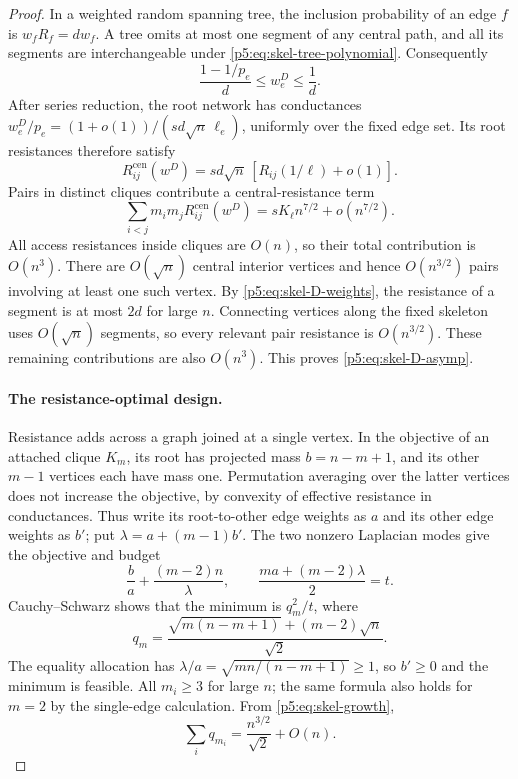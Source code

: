 \documentclass[11pt,a4paper]{article}
\theoremstyle{definition}
\theoremstyle{remark}
\numberwithin{equation}{section}
\begin{document}
\begin{proof}
In a weighted random spanning tree, the inclusion probability
of an edge $f$ is $w_fR_f=dw_f$.  A tree omits at most one
segment of any central path, and all its segments are
interchangeable under \eqref{p5:eq:skel-tree-polynomial}.  Consequently
\begin{equation}\label{p5:eq:skel-D-weights}
 \frac{1-1/p_e}{d}\leq w_e^D\leq\frac1d.
\end{equation}
After series reduction, the root network has conductances
$w_e^D/p_e=(1+o(1))/(s d\sqrt n\,\ell_e)$, uniformly over the
fixed edge set.  Its root resistances therefore satisfy
\[
 R_{ij}^{\mathrm{cen}}(w^D)
 =s d\sqrt n\,[R_{ij}(1/\ell)+o(1)].
\]
Pairs in distinct cliques contribute a central-resistance term
\[
 \sum_{i<j}m_im_jR_{ij}^{\mathrm{cen}}(w^D)
 =sK_\ell n^{7/2}+o(n^{7/2}).
\]
All access resistances inside cliques are $O(n)$, so their
total contribution is $O(n^3)$.  There are $O(\sqrt n)$
central interior vertices and hence $O(n^{3/2})$ pairs
involving at least one such vertex.  By
\eqref{p5:eq:skel-D-weights}, the resistance of a segment is at
most $2d$ for large $n$.  Connecting vertices along the fixed
skeleton uses $O(\sqrt n)$ segments, so every relevant pair
resistance is $O(n^{3/2})$.  These remaining contributions are
also $O(n^3)$.  This proves \eqref{p5:eq:skel-D-asymp}.

\paragraph{The resistance-optimal design.}
Resistance adds across a graph joined at a single vertex.
In the objective of an attached clique $K_m$, its root has
projected mass $b=n-m+1$, and its other $m-1$ vertices each
have mass one.  Permutation averaging over the latter vertices
does not increase the objective, by convexity of effective
resistance in conductances.  Thus write its root-to-other
edge weights as $a$ and its other edge weights as $b'$;
put $\lambda=a+(m-1)b'$.  The two nonzero Laplacian modes
give the objective and budget
\[
 \frac{b}{a}+\frac{(m-2)n}{\lambda},\qquad
 \frac{ma+(m-2)\lambda}{2}=t.
\]
Cauchy--Schwarz shows that the minimum is $q_m^2/t$, where
\begin{equation}\label{p5:eq:skel-clique-q}
 q_m=\frac{\sqrt{m(n-m+1)}+(m-2)\sqrt n}{\sqrt2}.
\end{equation}
The equality allocation has
$\lambda/a=\sqrt{mn/(n-m+1)}\geq1$, so $b'\geq0$ and the
minimum is feasible.  All $m_i\geq3$ for large $n$; the
same formula also holds for $m=2$ by the single-edge calculation.
From \eqref{p5:eq:skel-growth},
\begin{equation}\label{p5:eq:skel-q-sum}
 \sum_i q_{m_i}=\frac{n^{3/2}}{\sqrt2}+O(n).
\end{equation}


\end{proof}
\end{document}
